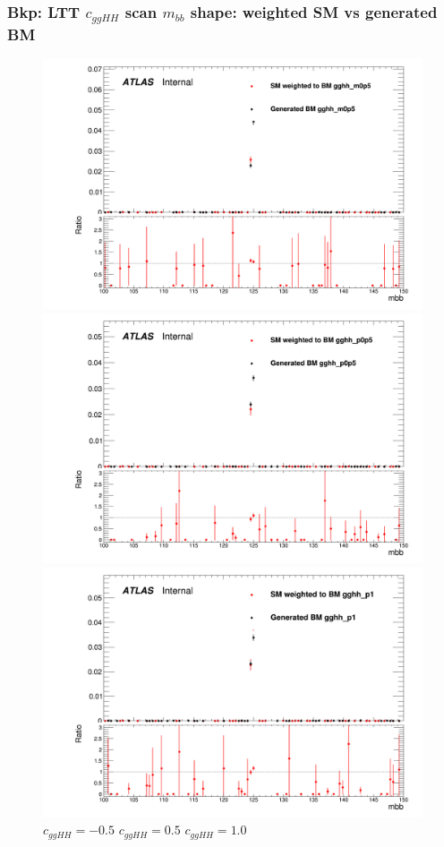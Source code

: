 \documentclass[twoside,11pt]{beamer}
\begin{document}
\begin{frame}
\frametitle{Bkp: LTT $c_{ggHH}$ scan $m_{bb}$ shape: weighted SM vs generated BM}

\begin{figure}
\includegraphics[width=.32\textwidth]{figures/Method_B_all_latest_LTT/BMgghh_m0p5h_mbb.png}
\includegraphics[width=.32\textwidth]{figures/Method_B_all_latest_LTT/BMgghh_p0p5h_mbb.png}
\includegraphics[width=.32\textwidth]{figures/Method_B_all_latest_LTT/BMgghh_p1h_mbb.png}
$c_{ggHH} = -0.5$ \hspace{5em} $c_{ggHH} = 0.5$\hspace{5em} $c_{ggHH} = 1.0$
\end{figure}


\end{frame}     
\end{document}
